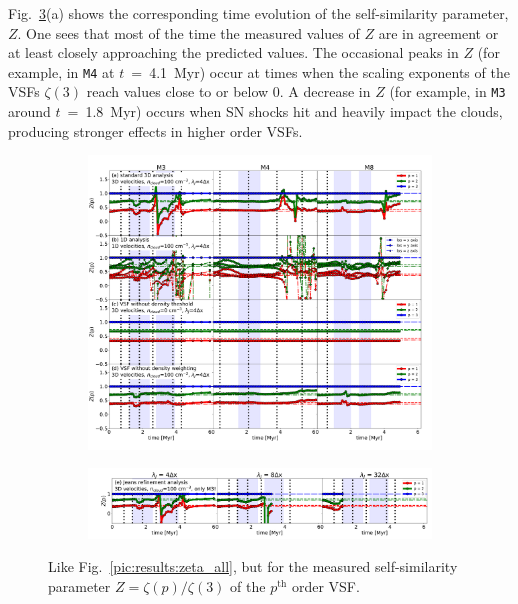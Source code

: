 Fig.~\ref{pic:results:z_all}(a) shows the corresponding time evolution of the self-similarity parameter, $Z$. 
One sees that most of the time the measured values of $Z$ are in agreement or at least closely approaching the predicted values. 
The occasional peaks in $Z$ (for example, in \texttt{M4} at $t$~=~4.1~Myr) occur at times when the scaling exponents of the VSFs $\zeta(3)$ reach values close to or below 0.
A decrease in $Z$ (for example, in \texttt{M3} around $t$~=~1.8~Myr) occurs when SN shocks hit and heavily impact the clouds, producing stronger effects in higher order VSFs.

\begin{figure}[!htb]
	\centering  
  
  \begin{subfigure}[c]{\textwidth}
      \includegraphics[width=\textwidth]{z_all_nojeans.pdf}
      \label{pic:results:z_all_nojeans}
  \end{subfigure}
  
  \begin{subfigure}[c]{\textwidth}
      \addtocounter{subfigure}{4}
      \includegraphics[width=\textwidth]{z_jeans.pdf}
      \label{pic:results:z_all_jeans}
  \end{subfigure}
  
  \caption{Like Fig.~\ref{pic:results:zeta_all}, but for the measured self-similarity parameter $Z = \zeta(p) / \zeta(3)$ of the $p^\mathrm{th}$ order VSF.}
	\label{pic:results:z_all}
\end{figure}

